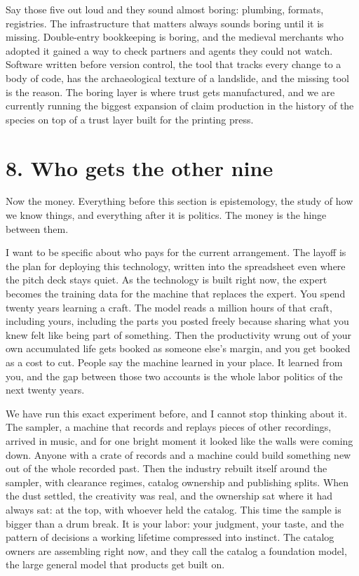 \documentclass[11pt]{article}
\begin{document}
Say those five out loud and they sound almost boring: plumbing, formats, registries. The infrastructure that matters always sounds boring until it is missing. Double-entry bookkeeping is boring, and the medieval merchants who adopted it gained a way to check partners and agents they could not watch. Software written before version control, the tool that tracks every change to a body of code, has the archaeological texture of a landslide, and the missing tool is the reason. The boring layer is where trust gets manufactured, and we are currently running the biggest expansion of claim production in the history of the species on top of a trust layer built for the printing press.

\section*{8. Who gets the other nine}

Now the money. Everything before this section is epistemology, the study of how we know things, and everything after it is politics. The money is the hinge between them.

I want to be specific about who pays for the current arrangement. The layoff is the plan for deploying this technology, written into the spreadsheet even where the pitch deck stays quiet. As the technology is built right now, the expert becomes the training data for the machine that replaces the expert. You spend twenty years learning a craft. The model reads a million hours of that craft, including yours, including the parts you posted freely because sharing what you knew felt like being part of something. Then the productivity wrung out of your own accumulated life gets booked as someone else's margin, and you get booked as a cost to cut. People say the machine learned in your place. It learned from you, and the gap between those two accounts is the whole labor politics of the next twenty years.

We have run this exact experiment before, and I cannot stop thinking about it. The sampler, a machine that records and replays pieces of other recordings, arrived in music, and for one bright moment it looked like the walls were coming down. Anyone with a crate of records and a machine could build something new out of the whole recorded past. Then the industry rebuilt itself around the sampler, with clearance regimes, catalog ownership and publishing splits. When the dust settled, the creativity was real, and the ownership sat where it had always sat: at the top, with whoever held the catalog. This time the sample is bigger than a drum break. It is your labor: your judgment, your taste, and the pattern of decisions a working lifetime compressed into instinct. The catalog owners are assembling right now, and they call the catalog a foundation model, the large general model that products get built on.
\end{document}
